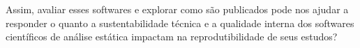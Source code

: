 %
%
%
%
%
%
%
%
%
%
%
%
%
%
%
%

Assim, avaliar esses softwares e explorar como são publicados pode nos ajudar a
responder o quanto a sustentabilidade técnica e a qualidade interna dos
softwares científicos de análise estática impactam na reprodutibilidade de seus
estudos?

